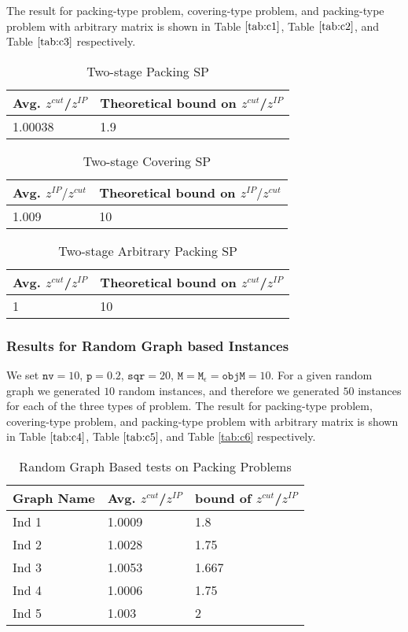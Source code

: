 \documentclass[smallextended]{svjour3}
\begin{document}
The result for packing-type problem, covering-type problem, and packing-type problem with arbitrary matrix is shown in Table $\ref{tab:c1}$, Table $\ref{tab:c2}$, and Table $\ref{tab:c3}$ respectively. 
\begin{table}[h]
\centering
\caption{Two-stage Packing SP}
\label{tab:c1}
\begin{tabular}{|l|l|}
\hline Avg. $z^{cut}$/$z^{IP}$ & Theoretical bound on  $z^{cut}$/$z^{IP}$ \\ \hline
1.00038 & 1.9
\\ \hline
\end{tabular}
\end{table}

\begin{table}[h]
\centering
\caption{Two-stage Covering SP}
\label{tab:c2}
\begin{tabular}{|l|l|}
\hline Avg. $z^{IP}/z^{cut}$ & Theoretical bound on  $z^{IP}/z^{cut}$ \\ \hline
1.009 & 10
\\ \hline
\end{tabular}
\end{table}

\begin{table}[h]
\centering \caption{Two-stage Arbitrary Packing SP}
\label{tab:c3}
\begin{tabular}{|l|l|}
\hline Avg. $z^{cut}$/$z^{IP}$ & Theoretical bound on  $z^{cut}$/$z^{IP}$ \\ \hline
1 & 10
\\ \hline
\end{tabular}
\end{table}
\subsubsection{Results for Random Graph based Instances}
We set $\texttt{nv} = 10$, $\texttt{p} = 0.2$, $\texttt{sqr} = 20$, $\texttt{M} =\texttt{M}_{\epsilon} = \texttt{objM} = 10$. For a given random graph we generated $10$ random instances, and therefore we generated $50$ instances for each of the three types of problem. The result for packing-type problem, covering-type problem, and packing-type problem with arbitrary matrix is shown in Table $\ref{tab:c4}$, Table $\ref{tab:c5}$, and Table \ref{tab:c6} respectively.

\begin{table}[H]
\centering \caption{Random Graph Based tests on Packing Problems} \label{tab:c4}
\begin{tabular}{|l|l|l|}
\hline Graph Name & Avg. $z^{cut}$/$z^{IP}$ & bound of $z^{cut}$/$z^{IP}$ \\
\hline Ind 1& 1.0009     & 1.8               \\
\hline Ind 2      & 1.0028 & 1.75              \\
\hline Ind 3      & 1.0053     & 1.667 \\
\hline Ind 4      & 1.0006     & 1.75              \\
\hline Ind 5      & 1.003     & 2                \\
\hline
\end{tabular}
\end{table}
\end{document}
